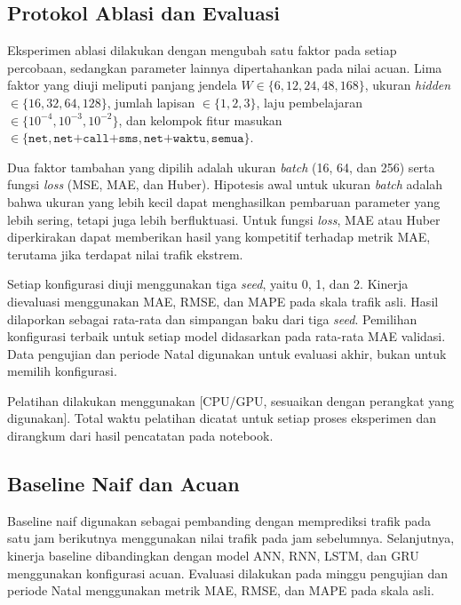 \documentclass[conference,a4paper]{IEEEtran}
\begin{document}
\subsection{Protokol Ablasi dan Evaluasi}

Eksperimen ablasi dilakukan dengan mengubah satu faktor
pada setiap percobaan, sedangkan parameter lainnya
dipertahankan pada nilai acuan. Lima faktor yang diuji
meliputi panjang jendela $W \in \{6,12,24,48,168\}$,
ukuran \textit{hidden} $\in \{16,32,64,128\}$, jumlah
lapisan $\in \{1,2,3\}$, laju pembelajaran
$\in \{10^{-4},10^{-3},10^{-2}\}$, dan kelompok fitur
masukan $\in \{\texttt{net},\texttt{net+call+sms},
\texttt{net+waktu},\texttt{semua}\}$.

Dua faktor tambahan yang dipilih adalah ukuran
\textit{batch} (16, 64, dan 256) serta fungsi
\textit{loss} (MSE, MAE, dan Huber). Hipotesis awal
untuk ukuran \textit{batch} adalah bahwa ukuran yang
lebih kecil dapat menghasilkan pembaruan parameter
yang lebih sering, tetapi juga lebih berfluktuasi.
Untuk fungsi \textit{loss}, MAE atau Huber diperkirakan
dapat memberikan hasil yang kompetitif terhadap metrik
MAE, terutama jika terdapat nilai trafik ekstrem.

Setiap konfigurasi diuji menggunakan tiga \textit{seed},
yaitu 0, 1, dan 2. Kinerja dievaluasi menggunakan MAE,
RMSE, dan MAPE pada skala trafik asli. Hasil dilaporkan
sebagai rata-rata dan simpangan baku dari tiga
\textit{seed}. Pemilihan konfigurasi terbaik untuk setiap
model didasarkan pada rata-rata MAE validasi. Data
pengujian dan periode Natal digunakan untuk evaluasi
akhir, bukan untuk memilih konfigurasi.

Pelatihan dilakukan menggunakan [CPU/GPU, sesuaikan
dengan perangkat yang digunakan]. Total waktu pelatihan
dicatat untuk setiap proses eksperimen dan dirangkum
dari hasil pencatatan pada notebook.


\subsection{Baseline Naif dan Acuan}

Baseline naif digunakan sebagai pembanding dengan
memprediksi trafik pada satu jam berikutnya menggunakan
nilai trafik pada jam sebelumnya. Selanjutnya, kinerja
baseline dibandingkan dengan model ANN, RNN, LSTM, dan
GRU menggunakan konfigurasi acuan. Evaluasi dilakukan
pada minggu pengujian dan periode Natal menggunakan
metrik MAE, RMSE, dan MAPE pada skala asli.
\end{document}
